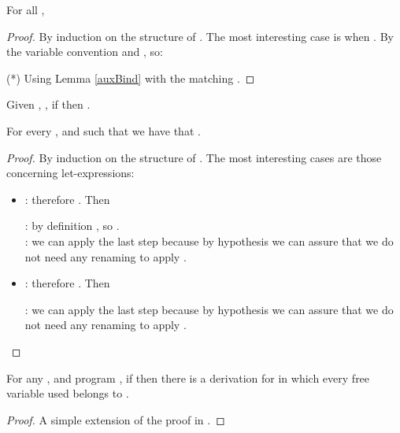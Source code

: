 \begin{lemma}\label{LCasc1}
For all , 
\end{lemma}
\begin{proof}\label{DEMO_LCasc1}
By induction on the structure of . The most interesting case is when .
By the variable convention  and , so:

(*) Using Lemma \ref{auxBind} with the matching .
\end{proof}

\begin{lemma}\label{lemaAproxTheta}
Given , , if  then .
\end{lemma}


\begin{lemma}\label{T28}\label{lemSintaxtConSubst}
For every ,  and  such that  we have that . \end{lemma}
\begin{proof}
By induction on the structure of . The most interesting cases are those concerning let-expressions:
\begin{itemize}
        \item : therefore . Then

: by definition , so .\\
: we can apply the last step because by hypothesis we can assure that we do not need any renaming to apply .
        \item : therefore . Then

: we can apply the last step because by hypothesis we can assure that we do not need any renaming to apply .
\end{itemize}
\end{proof}


\begin{lemma}\label{lDios}
For any ,  and program , if
 then there is a derivation for  in which every
free variable used belongs to .\end{lemma}
\begin{proof}\label{DEMO_lDios}A simple extension of the proof in \cite{DiosLopez07}.
\end{proof}



